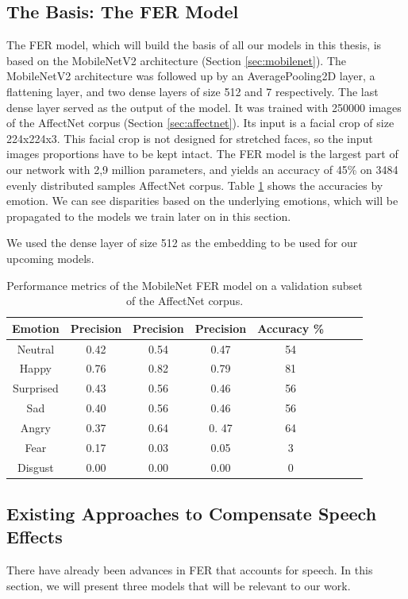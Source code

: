 \subsection{The Basis: The FER Model}
\label{sec:fer_base}
The FER model, which will build the basis of all our models in this thesis, is based on the MobileNetV2 architecture (Section \ref{sec:mobilenet}). The MobileNetV2 architecture was followed up by an AveragePooling2D layer, a flattening layer, and two dense layers of size 512 and 7 respectively. The last dense layer served as the output of the model. It was trained with 250000 images of the AffectNet corpus (Section \ref{sec:affectnet}). Its input is a facial crop of size 224x224x3. This facial crop is not designed for stretched faces, so the input images proportions have to be kept intact. The FER model is the largest part of our network with 2,9 million parameters, and yields an accuracy of 45\% on 3484 evenly distributed samples AffectNet corpus. Table \ref{tab:fer_base_acc} shows the accuracies by emotion. We can see disparities based on the underlying emotions, which will be propagated to the models we train later on in this section.

We used the dense layer of size 512 as the embedding to be used for our upcoming models.

\begin{table}
    \centering
    \begin{tabular}{c|ccccccc}
        \textbf{Emotion} & \textbf{Precision} & \textbf{Precision} & \textbf{Precision} & \textbf{Accuracy \%}  \\ \hline
         Neutral & 0.42 & 0.54 & 0.47 & 54\\
         Happy & 0.76 & 0.82 & 0.79 & 81\\
         Surprised & 0.43 & 0.56 & 0.46 & 56\\
         Sad & 0.40 & 0.56 & 0.46  & 56\\
         Angry & 0.37 & 0.64 & 0. 47 & 64\\
         Fear & 0.17 & 0.03 & 0.05 & 3\\
         Disgust & 0.00 & 0.00 & 0.00 & 0\\ \hline
         
    \end{tabular}
    \caption{Performance metrics of the MobileNet FER model on a validation subset of the AffectNet corpus.}
    \label{tab:fer_base_acc}
\end{table}


\subsection{Existing Approaches to Compensate Speech Effects}
\label{sec:existing}
There have already been advances in FER that accounts for speech. In this section, we will present three models that will be relevant to our work.

